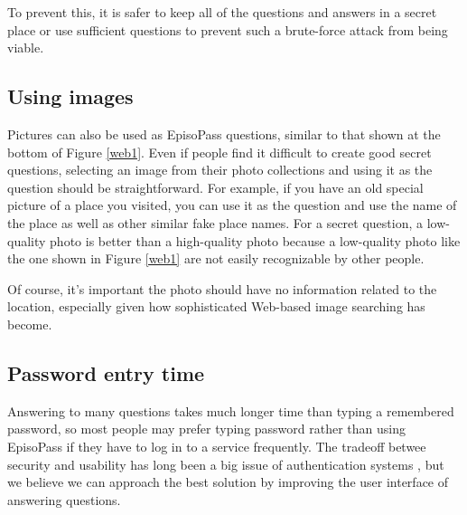 \documentclass[runningheads,a4paper]{llncs}
\begin{document}
%
To prevent this, it is safer to keep all of the questions and answers
in a secret place or
use sufficient questions to prevent such a brute-force attack from being viable.

\subsection{Using images}


Pictures can also be used as EpisoPass questions,
similar to that shown at the bottom of Figure \ref{web1}.
Even if people find it difficult to create good secret questions,
selecting an image from their photo collections
and using it as the question should be straightforward.
For example, if you have an old special picture of a place you visited,
you can use it as the question and use the name of the place
as well as other similar fake place names.
For a secret question, a low-quality photo is better than a
high-quality photo because a low-quality photo
like the one shown in Figure \ref{web1} are not
easily recognizable by other people.

Of course, it's important the photo should have no information related
to the location, especially given how sophisticated
Web-based image searching has become.

\subsection{Password entry time}

Answering to many questions takes much longer time than typing a
remembered password, so most people may prefer typing password
rather than using EpisoPass if they have to log in to a service frequently.
The tradeoff betwee security and usability has long been a big issue
of authentication systems \cite{Braz:2007:DTU:1778331.1778344},
but we believe we can approach the best solution by
improving the user interface of answering questions.

\end{document}
